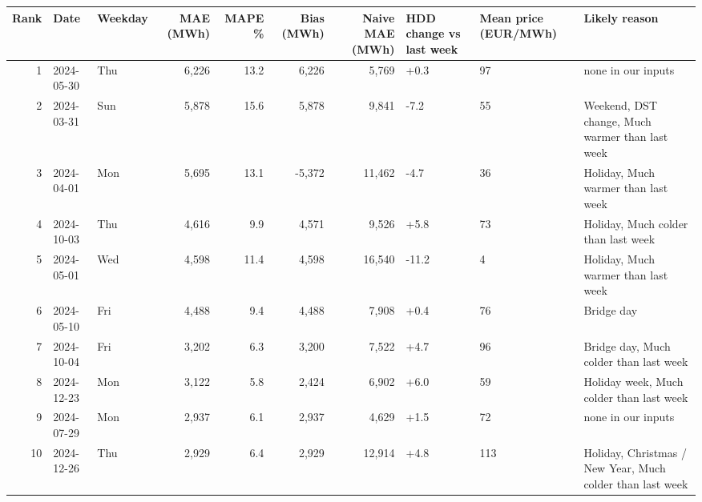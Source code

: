 \begin{tabular}{rllrrrrlll}
\toprule
Rank & Date & Weekday & MAE (MWh) & MAPE \% & Bias (MWh) & Naive MAE (MWh) & HDD change vs last week & Mean price (EUR/MWh) & Likely reason \\
\midrule
1 & 2024-05-30 & Thu & 6,226 & 13.2 & 6,226 & 5,769 & +0.3 & 97 & none in our inputs \\
2 & 2024-03-31 & Sun & 5,878 & 15.6 & 5,878 & 9,841 & -7.2 & 55 & Weekend, DST change, Much warmer than last week \\
3 & 2024-04-01 & Mon & 5,695 & 13.1 & -5,372 & 11,462 & -4.7 & 36 & Holiday, Much warmer than last week \\
4 & 2024-10-03 & Thu & 4,616 & 9.9 & 4,571 & 9,526 & +5.8 & 73 & Holiday, Much colder than last week \\
5 & 2024-05-01 & Wed & 4,598 & 11.4 & 4,598 & 16,540 & -11.2 & 4 & Holiday, Much warmer than last week \\
6 & 2024-05-10 & Fri & 4,488 & 9.4 & 4,488 & 7,908 & +0.4 & 76 & Bridge day \\
7 & 2024-10-04 & Fri & 3,202 & 6.3 & 3,200 & 7,522 & +4.7 & 96 & Bridge day, Much colder than last week \\
8 & 2024-12-23 & Mon & 3,122 & 5.8 & 2,424 & 6,902 & +6.0 & 59 & Holiday week, Much colder than last week \\
9 & 2024-07-29 & Mon & 2,937 & 6.1 & 2,937 & 4,629 & +1.5 & 72 & none in our inputs \\
10 & 2024-12-26 & Thu & 2,929 & 6.4 & 2,929 & 12,914 & +4.8 & 113 & Holiday, Christmas / New Year, Much colder than last week \\
\bottomrule
\end{tabular}
